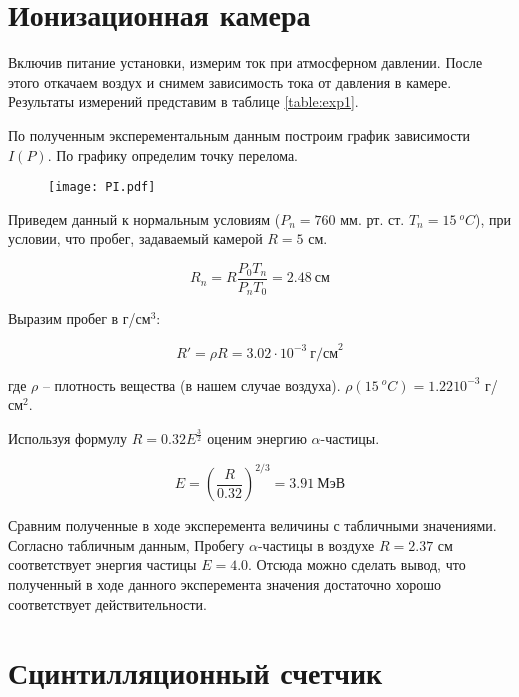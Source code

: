 


    


    \section*{Ионизационная камера}
    Включив питание установки, измерим ток при атмосферном давлении. После этого откачаем воздух
    и снимем зависимость тока от давления в камере. Результаты измерений представим в таблице \ref{table:exp1}.

    

    По полученным эксперементальным данным построим график зависимости $I(P)$. По графику определим точку перелома.

    \begin{figure}
        \centering
        \texttt{[image: PI.pdf]}
        \caption{}
        \label{fig:1}
    \end{figure}

    \begin{center}
    \end{center}

    Приведем данный к нормальным условиям ($P_n = 760$ мм. рт. ст. $T_n = 15 ~ ^oC$), при условии,
    что пробег, задаваемый камерой $R = 5$ см.

    \[ R_n = R \frac{P_0 T_n}{P_n T_0} = 2.48 ~ \text{см} \]

    Выразим пробег в г/см$^3$:

    \[ R' = \rho R = 3.02 \cdot 10^{-3} ~ \text{г/см}^2 \]

    где $\rho$ -- плотность вещества (в нашем случае воздуха). $\rho(15 ~ ^oC) = 1.22 10^{-3}$ г/см$^2$.

    Используя формулу $R = 0.32 E^{\frac{3}{2}}$ оценим энергию $\alpha$-частицы.

    \[ E = \left(\frac{R}{0.32} \right)^{2/3} = 3.91 ~ \text{МэВ} \]

    Сравним полученные в ходе эксперемента величины с табличными значениями. Согласно табличным данным,
    Пробегу $\alpha$-частицы в воздухе $R = 2.37$ см соответствует энергия частицы $E = 4.0$. Отсюда
    можно сделать вывод, что полученный в ходе данного эксперемента значения достаточно хорошо соответствует 
    действительности.

    \section*{Сцинтилляционный счетчик}

